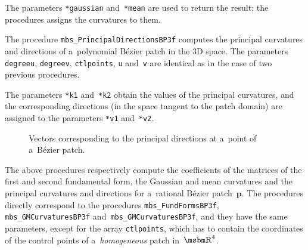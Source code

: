 The parameters \texttt{*gaussian} and~\texttt{*mean} are used to return
the result; the procedures assigns the curvatures to them.


\vspace{\bigskipamount}
The procedure \texttt{mbs\_PrincipalDirectionsBP3f} computes the principal
curvatures and directions of a~polynomial B\'{e}zier patch in the $3$D space.
The parameters \texttt{degreeu}, \texttt{degreev}, \texttt{ctlpoints}, \texttt{u}
and~\texttt{v} are identical as in the case of two previous procedures.

The parameters \texttt{*k1} and~\texttt{*k2} obtain the values of the principal
curvatures, and the corresponding directions (in the space tangent to the patch
domain) are assigned to the parameters \texttt{*v1} and~\texttt{*v2}.


\vspace{\bigskipamount}
\begin{figure}[ht]
  \centerline{}
  \caption{Vectors corresponding to the principal directions
    at a~point of a~B\'{e}zier patch.}
\end{figure}

\begin{sloppypar}
The above procedures respectively compute the coefficients of the
matrices of the first and second fundamental form, the Gaussian and mean
curvatures and the principal curvatures and directions for a~rational
B\'{e}zier patch~$\bm{p}$. The procedures directly correspond to
the procedures \texttt{mbs\_FundFormsBP3f}, \texttt{mbs\_GMCurvaturesBP3f}
and~\texttt{mbs\_GMCurvaturesBP3f}, and they have the same parameters,
except for the array \texttt{ctlpoints}, which has to contain the coordinates
of the control points of a~\emph{homogeneous} patch in~$\R^4$.
\end{sloppypar}


